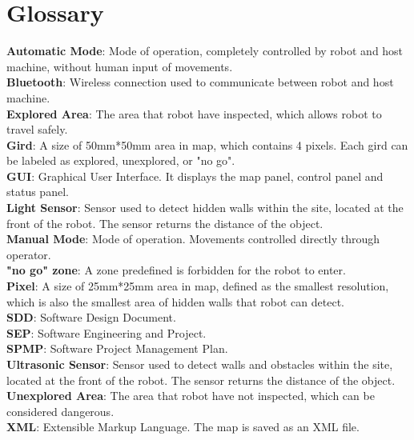 \documentclass[11pt, a4paper]{report}
\begin{document}
\chapter{Glossary}
\textbf{Automatic Mode}:  Mode of operation, completely controlled by robot and host machine, without human input of movements. 
\\ \textbf{Bluetooth}: Wireless connection used to communicate between robot and host machine.
\\ \textbf{Explored Area}: The area that robot have inspected, which allows robot to travel safely.  
\\ \textbf{Gird}: A size of 50mm*50mm area in map, which contains 4 pixels. Each gird can be labeled as explored, unexplored, or "no go".
\\ \textbf{GUI}: Graphical User Interface. It displays the map panel, control panel and status panel.
\\ \textbf{Light Sensor}: Sensor used to detect hidden walls within the site, located at the front of the robot. The sensor returns the distance of the object.
\\ \textbf{Manual Mode}: Mode of operation. Movements controlled directly through operator.
\\ \textbf{"no go" zone}: A zone predefined is forbidden for the robot to enter. 
\\ \textbf{Pixel}: A size of 25mm*25mm area in map, defined as the smallest resolution, which is also the smallest area of hidden walls that robot can detect.  
\\ \textbf{SDD}: Software Design Document.
\\ \textbf{SEP}: Software Engineering and Project.
\\ \textbf{SPMP}: Software Project Management Plan.
\\ \textbf{Ultrasonic Sensor}: Sensor used to detect walls and obstacles within the site, located at the front of the robot. The sensor returns the distance of the object.
\\ \textbf{Unexplored Area}: The area that robot have not inspected, which can be considered dangerous.  
\\ \textbf{XML}: Extensible Markup Language. The map is saved as an XML file.
\end{document}
